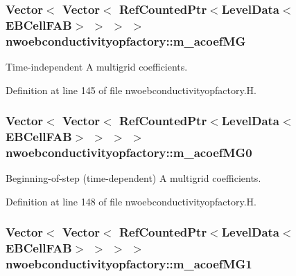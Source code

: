 \subsubsection[{\texorpdfstring{m\+\_\+acoef\+MG}{m_acoefMG}}]{\setlength{\rightskip}{0pt plus 5cm}Vector$<$ Vector$<$ Ref\+Counted\+Ptr$<$Level\+Data$<$E\+B\+Cell\+F\+AB$>$ $>$ $>$ $>$ nwoebconductivityopfactory\+::m\+\_\+acoef\+MG\hspace{0.3cm}{\ttfamily [protected]}}\hypertarget{classnwoebconductivityopfactory_ad336a5da2bf9ebfc1470688e5e0c90ce}{}\label{classnwoebconductivityopfactory_ad336a5da2bf9ebfc1470688e5e0c90ce}


Time-\/independent A multigrid coefficients. 



Definition at line 145 of file nwoebconductivityopfactory.\+H.

\subsubsection[{\texorpdfstring{m\+\_\+acoef\+M\+G0}{m_acoefMG0}}]{\setlength{\rightskip}{0pt plus 5cm}Vector$<$ Vector$<$ Ref\+Counted\+Ptr$<$Level\+Data$<$E\+B\+Cell\+F\+AB$>$ $>$ $>$ $>$ nwoebconductivityopfactory\+::m\+\_\+acoef\+M\+G0\hspace{0.3cm}{\ttfamily [protected]}}\hypertarget{classnwoebconductivityopfactory_a9c9140eb99f9ffc5c7ea8fc6e009fafe}{}\label{classnwoebconductivityopfactory_a9c9140eb99f9ffc5c7ea8fc6e009fafe}


Beginning-\/of-\/step (time-\/dependent) A multigrid coefficients. 



Definition at line 148 of file nwoebconductivityopfactory.\+H.

\subsubsection[{\texorpdfstring{m\+\_\+acoef\+M\+G1}{m_acoefMG1}}]{\setlength{\rightskip}{0pt plus 5cm}Vector$<$ Vector$<$ Ref\+Counted\+Ptr$<$Level\+Data$<$E\+B\+Cell\+F\+AB$>$ $>$ $>$ $>$ nwoebconductivityopfactory\+::m\+\_\+acoef\+M\+G1\hspace{0.3cm}{\ttfamily [protected]}}\hypertarget{classnwoebconductivityopfactory_a0f501febd3597e21edc61fad53ddaccd}{}\label{classnwoebconductivityopfactory_a0f501febd3597e21edc61fad53ddaccd}


